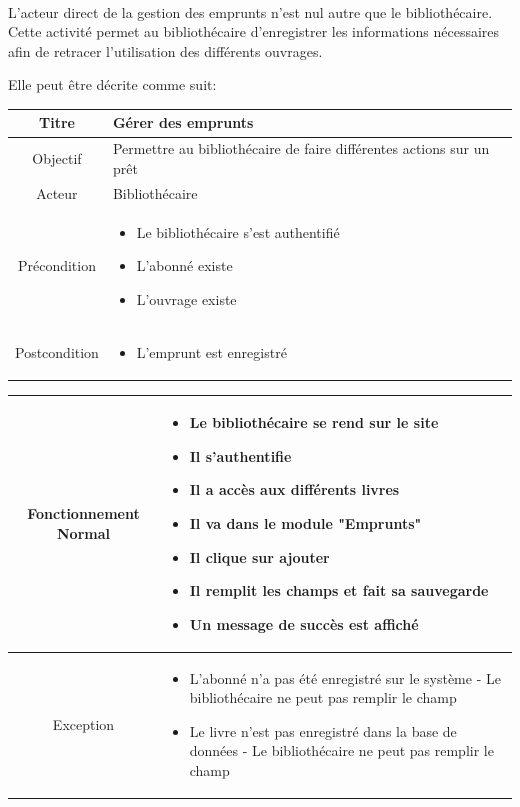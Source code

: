 \paragraph{}
L'acteur direct de la gestion des emprunts n'est nul autre que le bibliothécaire. Cette activité 
permet au bibliothécaire d'enregistrer les informations nécessaires afin de retracer l'utilisation
des différents ouvrages.\par 
Elle peut être décrite comme suit: \par 
\begin{tabular}{|c|p{7cm}|}
        \hline
        Titre & Gérer des emprunts \\
        \hline
        Objectif & Permettre au bibliothécaire de faire différentes actions sur un prêt \\
        \hline
        Acteur & Bibliothécaire \\
        \hline
        Précondition & \begin{itemize}
                \item Le bibliothécaire s'est authentifié 
                \item L'abonné existe
                \item L'ouvrage existe
        \end{itemize} \\
        \hline
        Postcondition & \begin{itemize}
                \item L'emprunt est enregistré 
        \end{itemize} \\
        \hline
\end{tabular}
\par 
\begin{tabular}{|c|p{7cm}|}
        \hline
        Fonctionnement Normal & \begin{itemize}
                \item Le bibliothécaire se rend sur le site
                \item Il s'authentifie
                \item Il a accès aux différents livres
                \item Il va dans le module "Emprunts"
                \item Il clique sur ajouter
                \item Il remplit les champs et fait sa sauvegarde
                \item Un message de succès est affiché
        \end{itemize} \\
        \hline
        Exception & \begin{itemize}
                \item L'abonné n'a pas été enregistré sur le système - Le bibliothécaire ne peut pas remplir le champ
                \item Le livre n'est pas enregistré dans la base de données - Le bibliothécaire ne peut pas remplir le champ
        \end{itemize} \\
        \hline
\end{tabular}


